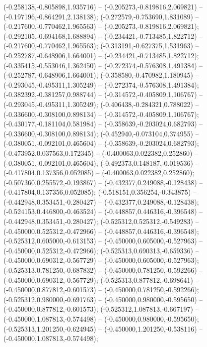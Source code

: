  (-0.258138,-0.805898,1.935716) -- (-0.205273,-0.819816,2.069821) -- (-0.197196,-0.864291,2.138138);
 (-0.272579,-0.753690,1.831089) -- (-0.217600,-0.770462,1.965563) -- (-0.205273,-0.819816,2.069821);
 (-0.292105,-0.694168,1.688894) -- (-0.234421,-0.713485,1.822712) -- (-0.217600,-0.770462,1.965563);
 (-0.313191,-0.627375,1.531963) -- (-0.252787,-0.648906,1.664001) -- (-0.234421,-0.713485,1.822712);
 (-0.335415,-0.553046,1.362450) -- (-0.272374,-0.576308,1.491384) -- (-0.252787,-0.648906,1.664001);
 (-0.358580,-0.470982,1.180945) -- (-0.293045,-0.495311,1.305249) -- (-0.272374,-0.576308,1.491384);
 (-0.382392,-0.381257,0.988744) -- (-0.314572,-0.405809,1.106767) -- (-0.293045,-0.495311,1.305249);
 (-0.406438,-0.284321,0.788022) -- (-0.336600,-0.308100,0.898134) -- (-0.314572,-0.405809,1.106767);
 (-0.430177,-0.181104,0.581984) -- (-0.358639,-0.203024,0.682793) -- (-0.336600,-0.308100,0.898134);
 (-0.452940,-0.073104,0.374955) -- (-0.380051,-0.092101,0.465604) -- (-0.358639,-0.203024,0.682793);
 (-0.473952,0.037563,0.172345) -- (-0.400063,0.022382,0.252860) -- (-0.380051,-0.092101,0.465604);
 (-0.492373,0.148187,-0.019536) -- (-0.417804,0.137356,0.052085) -- (-0.400063,0.022382,0.252860);
 (-0.507360,0.255572,-0.193867) -- (-0.432377,0.249088,-0.128438) -- (-0.417804,0.137356,0.052085);
 (-0.518151,0.356254,-0.343875) -- (-0.442948,0.353451,-0.280427) -- (-0.432377,0.249088,-0.128438);
 (-0.524153,0.446800,-0.463524) -- (-0.448857,0.446316,-0.396548) -- (-0.442948,0.353451,-0.280427);
 (-0.525312,0.525312,-0.549283) -- (-0.450000,0.525312,-0.472966) -- (-0.448857,0.446316,-0.396548);
 (-0.525312,0.605000,-0.613153) -- (-0.450000,0.605000,-0.527963) -- (-0.450000,0.525312,-0.472966);
 (-0.525313,0.690313,-0.659336) -- (-0.450000,0.690312,-0.567729) -- (-0.450000,0.605000,-0.527963);
 (-0.525313,0.781250,-0.687832) -- (-0.450000,0.781250,-0.592266) -- (-0.450000,0.690312,-0.567729);
 (-0.525313,0.877812,-0.698641) -- (-0.450000,0.877812,-0.601573) -- (-0.450000,0.781250,-0.592266);
 (-0.525312,0.980000,-0.691763) -- (-0.450000,0.980000,-0.595650) -- (-0.450000,0.877812,-0.601573);
 (-0.525312,1.087813,-0.667197) -- (-0.450000,1.087813,-0.574498) -- (-0.450000,0.980000,-0.595650);
 (-0.525313,1.201250,-0.624945) -- (-0.450000,1.201250,-0.538116) -- (-0.450000,1.087813,-0.574498);
